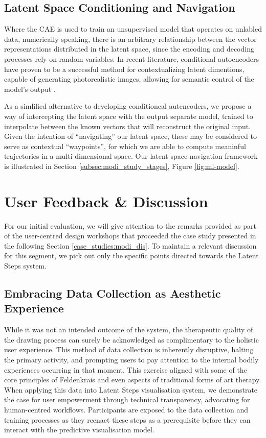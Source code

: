 \subsection*{Latent Space Conditioning and Navigation}

Where the CAE is used to train an unsupervised model that operates on unlabled data, numerically speaking, there is an arbitrary relationship between the vector representations distributed in the latent space, since the encoding and decoding processes rely on random variables. In recent literature, conditional autoencoders have proven to be a successful method for contextualizing latent dimentions, capable of generating photorealistic images, allowing for semantic control of the model's output \cite{zhang_age_2017}.

As a simlified alternative to developing conditioneal autencoders, we propose a way of intercepting the latent space with the output separate model, trained to interpolate between the known vectors that will reconstruct the original input. Given the intention of ``navigating'' our latent space, these may be considered to serve as contextual ``waypoints'', for which we are able to compute meaninful trajectories in a multi-dimensional space. Our latent space navigation framework is illustrated in Section \ref{subsec:modi_study_stages}, Figure \ref{fig:ml-model}.

\section{User Feedback \& Discussion}

For our initial evaluation, we will give attention to the remarks provided as part of the user-centred design workshops that proceeded the case study presented in the following Section \ref{case_studies:modi_dis}. To maintain a relevant discussion for this segment, we pick out only the specific points directed towards the Latent Steps system.

\subsection*{Embracing Data Collection as Aesthetic Experience}

While it was not an intended outcome of the system, the therapeutic quality of the drawing process can surely be acknowledged as complimentary to the holistic user experience. This method of data collection is inherently disruptive, halting the primary activity, and prompting users to pay attention to the internal bodily experiences occurring in that moment. This exercise aligned with some of the core principles of Feldenkrais and even aspects of traditional forms of art therapy. When applying this data into Latent Steps visualisation system, we demonstrate the case for user empowerment through technical transparency, advocating for human-centred workflows. Participants are exposed to the data collection and training processes as they reenact these steps as a prerequisite before they can interact with the predictive visualisation model.

